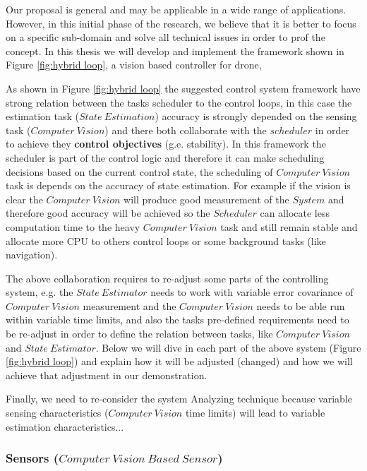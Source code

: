 \documentclass[11pt]{article}
\begin{document}
Our proposal is general and may be applicable in a wide range of applications. However, in this initial phase of the research, we believe that it is better to focus on a specific sub-domain and solve all technical issues in order to prof the concept.
In this thesis we will develop and implement the framework shown in Figure \ref{fig:hybrid loop}, a vision based controller for drone, 

As shown in Figure \ref{fig:hybrid loop} the suggested control system framework have strong relation between the tasks scheduler to the control loops, in this case the estimation task ($State~Estimation$) accuracy is strongly depended on the sensing task ($Computer~Vision$) and there both collaborate with the $scheduler$ in order to achieve they \textbf{control objectives} (g.e. stability).
In this framework the scheduler is part of the control logic and therefore it can make scheduling decisions based on the current control state, the scheduling of $Computer~Vision$ task is depends on the accuracy of state estimation.
For example if the vision is clear the $Computer~Vision$ will produce good measurement of the $System$ and therefore good accuracy will be achieved so the $Scheduler$ can allocate less computation time to the heavy $Computer~Vision$ task and still remain stable and allocate more CPU to others control loops or some background tasks (like navigation).

The above collaboration requires to re-adjust some parts of the controlling system, e.g. the $State~Estimator$ needs to work with variable error covariance of $Computer~Vision$ measurement and the $Computer~Vision$ needs to be able run within variable time limits, and also the tasks pre-defined requirements need to be re-adjust in order to define the relation between tasks, like $Computer~Vision$ and $State~Estimator$.
Below we will dive in each part of the above system (Figure \ref{fig:hybrid loop}) and explain how it will be adjusted (changed) and how we will achieve that adjustment in our demonstration.

Finally, we need to re-consider the system Analyzing technique because variable sensing characteristics ($Computer~Vision$ time limits) will lead to variable estimation characteristics... %

\subsubsection{Sensors ($Computer~Vision~Based~Sensor$)}
\label{sec:sensors}
\end{document}
